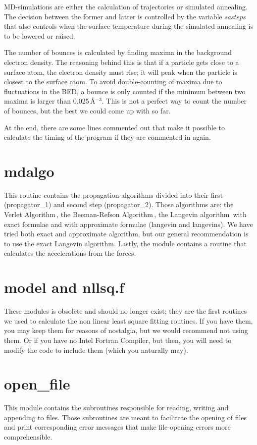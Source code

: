 \documentclass[twoside, 11pt, titlepage, captions=nooneline, a4paper, headsepline]{scrbook}%
\newcommand{\9}{\mathrm}
\newcommand{\0}{\,\mathrm}
\begin{document}
MD-simulations are either the calculation of trajectories or simulated annealing. The decision between the former and latter is controlled by the variable \textit{sasteps} that also controls when the surface temperature during the simulated annealing is to be lowered or raised.

The number of bounces is calculated by finding maxima in the background electron density. The reasoning behind this is that if a particle gets close to a surface atom, the electron density must rise; it will peak when the particle is closest to the surface atom. To avoid double-counting of maxima due to fluctuations in the BED, a bounce is only counted if the minimum between two maxima is larger than 0.025\,\AA$^{-3}$. This is not a perfect way to count the number of bounces, but the best we could come up with so far.

At the end, there are some lines commented out that make it possible to calculate the timing  of the program if they are commented in again.

\section{mdalgo}
This routine contains the propagation algorithms divided into their first (propagator\_1) and second step (propagator\_2). Those algorithms are: the Verlet Algorithm\,\cite{allen1989}, the Beeman-Refson Algorithm\,\cite{refson1985}, the Langevin algorithm\,\cite{allen1989} with exact formulae and with approximate formulae (langevin and langevins). We have tried both exact and approximate algorithm, but our general recommendation is to use the exact Langevin algorithm. Lastly, the module contains a routine that calculates the accelerations from the forces.

\section{model and nllsq.f}
These modules is obsolete and should no longer exist; they are the first routines we used to calculate the non linear least square fitting routines. If you have them, you may keep them for reasons of nostalgia, but we would recommend not using them. Or if you have no Intel Fortran Compiler, but then, you will need to modify the code to include them (which you naturally may).
\section{open\_file}
This module contains the subroutines responsible for reading, writing and appending to files. Those subroutines are meant to facilitate the opening of files and print corresponding error messages that make file-opening errors more comprehensible.
\end{document}
